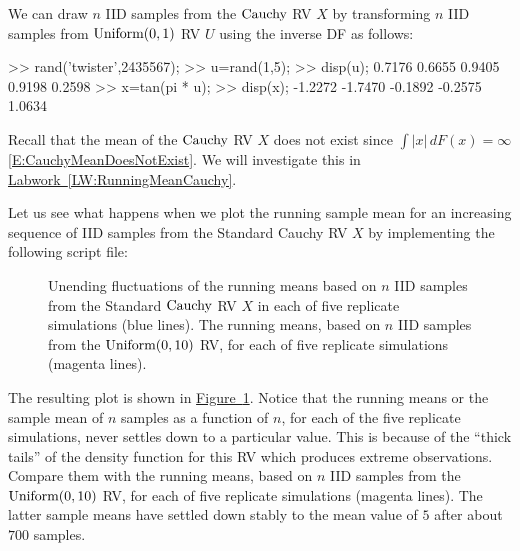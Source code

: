 \begin{simulation}[$\cauchy$]\label{SIM:StdCauchy}
We can draw $n$ IID samples from the $\cauchy$ RV $X$ by transforming $n$ IID samples from $\mbox{{\rm Uniform}}(0,1)$ RV $U$ using the inverse DF as follows:
\begin{VrbM}
>> rand('twister',2435567);        %
>> u=rand(1,5);			%
>> disp(u);			%
    0.7176    0.6655    0.9405    0.9198    0.2598
>> x=tan(pi * u);     %
>> disp(x);  %
   -1.2272   -1.7470   -0.1892   -0.2575    1.0634
\end{VrbM}
\end{simulation}
 Recall that the mean of the $\cauchy$ RV $X$ does not exist since $\int \left|x\right|\,dF(x) = \infty$ \eqref{E:CauchyMeanDoesNotExist}.  We will investigate this in \hyperref[LW:RunningMeanCauchy]{Labwork~\ref*{LW:RunningMeanCauchy}}.

 \begin{labwork}\label{LW:RunningMeanCauchy}
Let us see what happens when we plot the running sample mean for an increasing sequence of IID samples from the Standard Cauchy RV $X$ by implementing the following script file:


\begin{figure}[htpb]
\caption{Unending fluctuations of  the running means based on $n$ IID samples from the Standard $\cauchy$ RV $X$ in each of five replicate simulations (blue lines).  The running means, based on $n$ IID samples from the $\mbox{{\rm Uniform}}(0,10)$ RV, for each of five replicate simulations (magenta lines). \label{F:plot5RunningMeansStandardcauchyUnif010}}
\centering   {}
\end{figure}

The resulting plot is shown in \hyperref[F:plot5RunningMeansStandardcauchyUnif010]{Figure~\ref*{F:plot5RunningMeansStandardcauchyUnif010}}.  Notice that the running means or the sample mean of $n$ samples as  a function of $n$, for each of the five replicate simulations, never settles down to a particular value.  This is because of the ``thick tails'' of the density function for this RV which produces extreme observations.  Compare them with the running means, based on $n$ IID samples from the $\mbox{{\rm Uniform}}(0,10)$ RV, for each of five replicate simulations (magenta lines).  The latter sample means have settled down stably to the mean value of $5$ after about $700$ samples.
\end{labwork}

